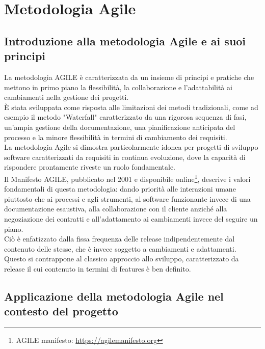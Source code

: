 \chapter{Metodologia Agile}
\label{cha:agile}

\section{Introduzione alla metodologia Agile e ai suoi principi}
\label{sec:introduzione_agile}

La metodologia AGILE è caratterizzata da un insieme di principi e pratiche che mettono
in primo piano la flessibilità, la collaborazione e l'adattabilità ai
cambiamenti nella gestione dei progetti.\\ È stata sviluppata come risposta alle
limitazioni dei metodi tradizionali, come ad esempio il metodo "Waterfall" caratterizzato
da una rigorosa sequenza di fasi, un'ampia gestione della documentazione, una pianificazione
anticipata del processo e la minore flessibilità in termini di cambiamento dei requisiti\cite{waterfall}.\\
La metodologia Agile si dimostra particolarmente idonea per progetti di sviluppo
software caratterizzati da requisiti in continua evoluzione, dove la capacità di
rispondere prontamente riveste un ruolo fondamentale.\\ Il Manifesto AGILE\cite{agile_manifesto},
pubblicato nel 2001 e disponibile online\footnote{AGILE manifesto: \url{https://agilemanifesto.org}},
descrive i valori fondamentali di questa metodologia: dando priorità alle
interazioni umane piuttosto che ai processi e agli strumenti, al software funzionante
invece di una documentazione esaustiva, alla collaborazione con il cliente
anziché alla negoziazione dei contratti e all'adattamento ai cambiamenti invece
del seguire un piano.\\ Ciò è enfatizzato dalla fissa frequenza delle release
indipendentemente dal contenuto delle stesse, che è invece soggetto a cambiamenti
e adattamenti.\\ Questo si contrappone al classico approccio allo sviluppo,
caratterizzato da release il cui contenuto in termini di features è ben definito\cite{impact_of_agile}.

\section{Applicazione della metodologia Agile nel contesto del progetto}
\label{sec:applicazione_agile}

